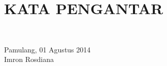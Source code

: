 \chapter*{KATA PENGANTAR}

\blindtext \\[2cm]

\hfill
\begin{minipage}[t]{4.9cm}
\centering
	Pamulang, 01 Agustus 2014 \\ [2cm]
	Imron Rosdiana
\end{minipage}

\newpage